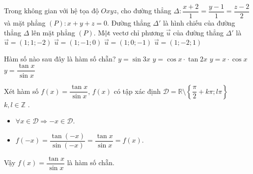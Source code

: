 \begin{ex}%
	Trong không gian với hệ tọa độ $Oxyz$, cho đường thẳng $\Delta: \dfrac{x + 2}{1}=\dfrac{y - 1}{1}=\dfrac{z - 2}{2}$ và mặt phẳng $(P): x + y + z=0. $ Đường thẳng ${\Delta}'$ là hình chiếu của đường thẳng $\Delta $ lên mặt phẳng $(P). $ Một vectơ chỉ phương $\overrightarrow{u}$ của đường thẳng ${\Delta}'$ là
	\choice
	{\True $\overrightarrow{u}=\left(1; 1; - 2\right)$}
	{$\overrightarrow{u}=\left(1; - 1; 0\right)$}
	{$\overrightarrow{u}=\left(1; 0; - 1\right)$}
	{$\overrightarrow{u}=\left(1; - 2; 1\right)$}
\end{ex}

\begin{ex}%
	Hàm số nào sau đây là hàm số chẵn?
	\choice
	{$y=\sin 3x$}
	{$y=\cos x \cdot \tan 2x$}
	{$y=x\cdot\cos x$}
	{\True $y=\dfrac{\tan x}{\sin x}$}
	\loigiai
	{
		Xét hàm số $f(x)=\dfrac{\tan x}{\sin x}$, $f(x)$ có tập xác định $\mathscr{D}=\mathbb{R} \setminus \left\lbrace \dfrac{\pi}{2}+k\pi;l\pi\right\rbrace $  $k,l \in \mathbb{Z}$ .
		\begin{itemize}
			\item $\forall x \in \mathscr{D} \Rightarrow -x \in \mathscr{D}$.
			\item $f(-x)=\dfrac{\tan (-x)}{\sin (-x)}=\dfrac{\tan x}{\sin x}=f(x)$.
		\end{itemize}
		Vậy $f(x)=\dfrac{\tan x}{\sin x}$ là hàm số chẵn.
	}
\end{ex}

